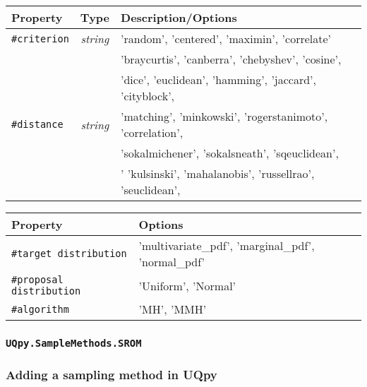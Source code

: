 \documentclass[./UsersGuide.tex]{subfiles}
\begin{document}
\begin{center}
	\begin{tabular}{ |l|c|l| } 
		\hline
		\textbf{Property} & \textbf{Type} & \textbf{Description/Options} \\
		\hline
		\texttt{\#criterion}& \textit{string} &  'random', 'centered', 'maximin', 'correlate'  \\ 
		\hline
		\multirow{5}{*}{\texttt{\#distance}} & \multirow{5}{*}{\textit{string}} & 'braycurtis', 'canberra', 'chebyshev', 'cosine', \\ 
		&  &  'dice', 'euclidean', 'hamming', 'jaccard',  'cityblock',   \\ 
		&  &  'matching', 'minkowski', 'rogerstanimoto',  'correlation', \\ 
		&  & 'sokalmichener', 'sokalsneath', 'sqeuclidean',  \\ 
		&  & ' 'kulsinski', 'mahalanobis', 'russellrao', 'seuclidean',  \\ 
		\hline
	\end{tabular}
\end{center}


\begin{center}
	\begin{tabular}{ |l|l| } 
		\hline
		\textbf{Property} &  \textbf{Options} \\
		\hline
		\texttt{\#target distribution}&   'multivariate\_pdf', 'marginal\_pdf', 'normal\_pdf'  \\ 
		\hline
		\texttt{\#proposal distribution}&   'Uniform', 'Normal'  \\ 
		\hline
		\texttt{\#algorithm}&   'MH', 'MMH'  \\ 
		\hline
	\end{tabular}
\end{center}

\subsubsection{\texttt{UQpy.SampleMethods.SROM}}



\subsubsection{Adding a sampling method in UQpy}
\end{document}
